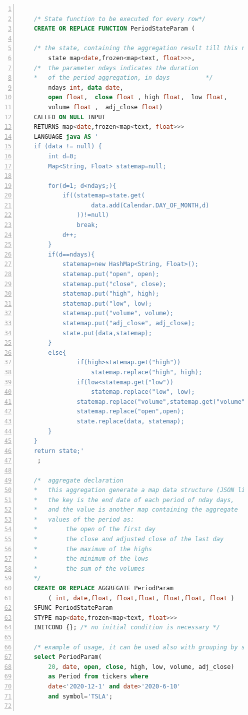 \begin{lstlisting}[basicstyle=\footnotesize,language=SQL,numbers=left,
    numberstyle=\footnotesize,numbersep=4pt,frame=single]

    /* State function to be executed for every row*/
    CREATE OR REPLACE FUNCTION PeriodStateParam ( 

    /* the state, containing the aggregation result till this row */
        state map<date,frozen<map<text, float>>>,
    /*  the parameter ndays indicates the duration 
    *   of the period aggregation, in days          */
        ndays int, data date,  
        open float,  close float , high float,  low float, 
        volume float ,  adj_close float)
    CALLED ON NULL INPUT 
    RETURNS map<date,frozen<map<text, float>>> 
    LANGUAGE java AS '
    if (data != null) { 
        int d=0;
        Map<String, Float> statemap=null;
       
        for(d=1; d<ndays;){
            if((statemap=state.get(
                    data.add(Calendar.DAY_OF_MONTH,d)
                ))!=null)
                break;
            d++;
        }
        if(d==ndays){
            statemap=new HashMap<String, Float>();
            statemap.put("open", open);
            statemap.put("close", close);
            statemap.put("high", high);
            statemap.put("low", low);
            statemap.put("volume", volume);
            statemap.put("adj_close", adj_close);
            state.put(data,statemap);
        }
        else{
                if(high>statemap.get("high"))
                    statemap.replace("high", high);
                if(low<statemap.get("low"))
                    statemap.replace("low", low); 
                statemap.replace("volume",statemap.get("volume")+ volume);
                statemap.replace("open",open);
                state.replace(data, statemap); 
        }
    } 
    return state;'
     ;
    
    /*  aggregate declaration
    *   this aggregation generate a map data structure (JSON like):
    *   the key is the end date of each period of nday days, 
    *   and the value is another map containing the aggregate 
    *   values of the period as:
    *        the open of the first day
    *        the close and adjusted close of the last day
    *        the maximum of the highs
    *        the minimum of the lows
    *        the sum of the volumes
    */
    CREATE OR REPLACE AGGREGATE PeriodParam 
        ( int, date,float, float,float, float,float, float ) 
    SFUNC PeriodStateParam
    STYPE map<date,frozen<map<text, float>>>
    INITCOND {}; /* no initial condition is necessary */
    
    /* example of usage, it can be used also with grouping by symbol */
    select PeriodParam(
        20, date, open, close, high, low, volume, adj_close)
        as Period from tickers where 
        date<'2020-12-1' and date>'2020-6-10' 
        and symbol='TSLA';
    
\end{lstlisting}

